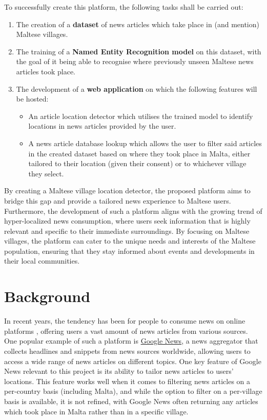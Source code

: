 \documentclass[a4paper, oneside, 11pt]{article}
\begin{document}
\begin{multicols*}{2}
  To successfully create this platform, the following tasks shall be carried out:
  \begin{enumerate}
    \item The creation of a \textbf{dataset} of news articles which take place in (and mention) Maltese villages.
    \item The training of a \textbf{Named Entity Recognition model} on this dataset, with the goal of it being able to recognise where previously unseen Maltese news articles took place.
    \item The development of a \textbf{web application} on which the following features will be hosted:
    \begin{itemize}
      \item An article location detector which utilises the trained model to identify locations in news articles provided by the user.
      \item A news article database lookup which allows the user to filter said articles in the created dataset based on where they took place in Malta, either tailored to their location (given their consent) or to whichever village they select.
    \end{itemize}
  \end{enumerate}

  By creating a Maltese village location detector, the proposed platform aims to bridge this gap and provide a tailored news experience to Maltese users. Furthermore, the development of such a platform aligns with the growing trend of hyper-localized news consumption, where users seek information that is highly relevant and specific to their immediate surroundings. By focusing on Maltese villages, the platform can cater to the unique needs and interests of the Maltese population, ensuring that they stay informed about events and developments in their local communities.


  \section{Background}
  In recent years, the tendency has been for people to consume news on online platforms \cite{bennett2008digital} \cite{ripolles2012beyond}, offering users a vast amount of news articles from various sources. One popular example of such a platform is \href{https://news.google.com/}{Google News}, a news aggregator that collects headlines and snippets from news sources worldwide, allowing users to access a wide range of news articles on different topics. One key feature of Google News relevant to this project is its ability to tailor news articles to users' locations. This feature works well when it comes to filtering news articles on a per-country basis (including Malta), and while the option to filter on a per-village basis is available, it is not refined, with Google News often returning any articles which took place in Malta rather than in a specific village.


\end{multicols*}
\end{document}
